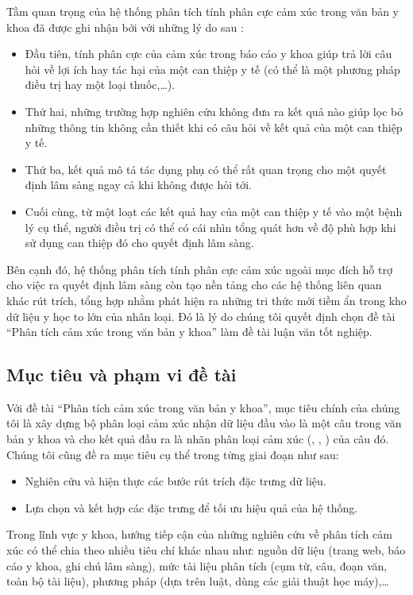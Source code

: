 Tầm quan trọng của hệ thống phân tích tính phân cực cảm xúc trong văn bản y khoa đã được ghi nhận bởi \cite{niu2005analysis} với những lý do sau : 
\begin{itemize}
\item Đầu tiên, tính phân cực của cảm xúc trong báo cáo y khoa giúp trả lời câu hỏi về lợi ích hay tác hại của một can thiệp y tế (có thể là một phương pháp điều trị hay một loại thuốc,\ldots).
\item Thứ hai, những trường hợp nghiên cứu không đưa ra kết quả nào giúp lọc bỏ những thông tin không cần thiết khi có câu hỏi về kết quả của một can thiệp y tế.
\item Thứ ba, kết quả \tieucuc mô tả tác dụng phụ có thể rất quan trọng cho một quyết định lâm sàng ngay cả khi không được hỏi tới.
\item Cuối cùng, từ một loạt các kết quả \tichcuc hay \tieucuc của một can thiệp y tế vào một bệnh lý cụ thể, người điều trị có thể có cái nhìn tổng quát hơn về độ phù hợp khi sử dụng can thiệp đó cho quyết định lâm sàng.
\end{itemize}

Bên cạnh đó, hệ thống phân tích tính phân cực cảm xúc ngoài mục đích hỗ trợ cho việc ra quyết định lâm sàng còn tạo nền tảng cho các hệ thống liên quan khác rút trích, tổng hợp nhằm phát hiện ra những tri thức mới tiềm ẩn trong kho dữ liệu y học to lớn của nhân loại. Đó là lý do chúng tôi quyết định chọn đề tài ``Phân tích cảm xúc trong văn bản y khoa'' làm đề tài luận văn tốt nghiệp.

\subsection{Mục tiêu và phạm vi đề tài}
Với đề tài ``Phân tích cảm xúc trong văn bản y khoa'', mục tiêu chính của chúng tôi là xây dựng bộ phân loại cảm xúc nhận dữ liệu đầu vào là một câu trong văn bản y khoa và cho kết quả đầu ra là nhãn phân loại cảm xúc (\tichcuc, \tieucuc, \trungtinh) của câu đó. Chúng tôi cũng đề ra mục tiêu cụ thể trong từng giai đoạn như sau:

\begin{itemize}
\item Nghiên cứu và hiện thực các bước rút trích đặc trưng dữ liệu.
\item Lựa chọn và kết hợp các đặc trưng để tối ưu hiệu quả của hệ thống.
\end{itemize}

Trong lĩnh vực y khoa, hướng tiếp cận của những nghiên cứu về phân tích cảm xúc có thể chia theo nhiều tiêu chí khác nhau như: nguồn dữ liệu (trang web, báo cáo y khoa, ghi chú lâm sàng), mức tài liệu phân tích (cụm từ, câu, đoạn văn, toàn bộ tài liệu), phương pháp (dựa trên luật, dùng các giải thuật học máy),\ldots \\

